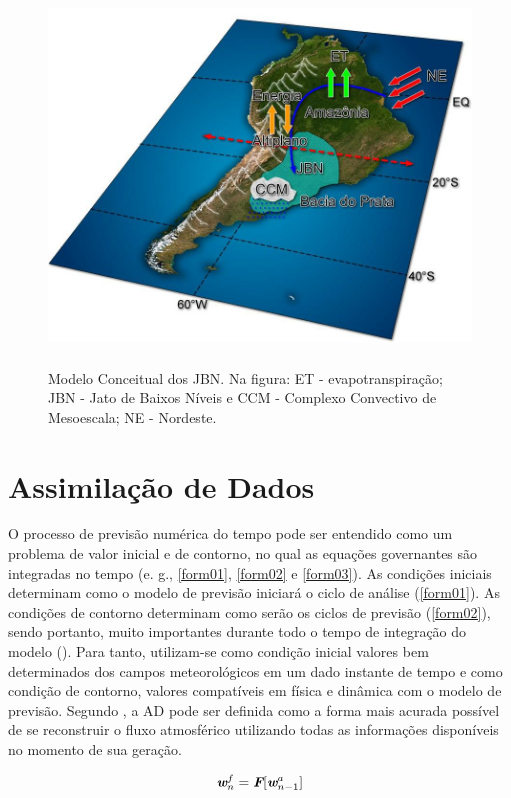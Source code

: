 \begin{figure}
\centering
\includegraphics[height=10cm]{./figs/fig10.png}
\caption{Modelo Conceitual dos JBN. Na figura: ET - evapotranspiração; JBN - Jato de Baixos Níveis e CCM - Complexo Convectivo de Mesoescala; NE - Nordeste.}
\label{fig10}
\end{figure}

\section{Assimilação de Dados}
\label{ss:assimdados}

O processo de previsão numérica do tempo pode ser entendido como um problema de valor inicial e de contorno, no qual as equações governantes são integradas no tempo (e. g., \autoref{form01}, \autoref{form02} e \autoref{form03}). As condições iniciais determinam como o modelo de previsão iniciará o ciclo de análise (\autoref{form01}). As condições de contorno determinam como serão os ciclos de previsão (\autoref{form02}), sendo portanto, muito importantes durante todo o tempo de integração do modelo (\cite{nowosad2001}). Para tanto, utilizam-se como condição inicial valores bem determinados dos campos meteorológicos em um dado instante de tempo e como condição de contorno, valores compatíveis em física e dinâmica com o modelo de previsão. Segundo \cite{talagrand1997}, a AD pode ser definida como a forma mais acurada possível de se reconstruir o fluxo atmosférico utilizando todas as informações disponíveis no momento de sua geração.

\begin{equation}
\textit{\textbf{w}}^{f}_{n}=\textit{\textbf{F}}[\textit{\textbf{w}}^{a}_{n-1}]
 \label{form04}
\end{equation}

